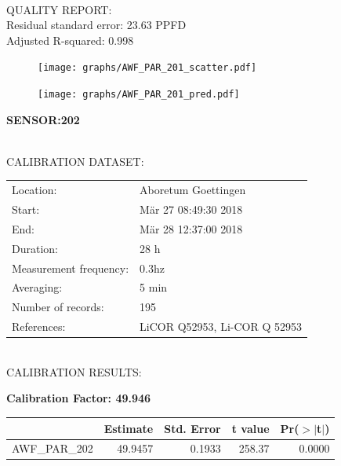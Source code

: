 \documentclass[oneside]{report}
\begin{document}
\hrulefill\\
QUALITY REPORT:\\
Residual standard error: 23.63 PPFD\\
Adjusted R-squared: 0.998



\begin{figure}[H]
  \centering
  \texttt{[image: graphs/AWF\_PAR\_201\_scatter.pdf]}
\end{figure}




\begin{figure}[H]
  \centering
  \texttt{[image: graphs/AWF\_PAR\_201\_pred.pdf]}
\end{figure}

\pagebreak


\begin{center}
\large{\textbf{SENSOR:202}}\\
\end{center}

\hrulefill\\
CALIBRATION DATASET:\\
\begin{table}[h!]
  \centering
  \label{tab:table1}
  \begin{tabular}{ll}
    Location: & Aboretum Goettingen\\ 
    
    
    Start:  & Mär 27 08:49:30 2018 \\
    End:   & Mär 28 12:37:00 2018\\ 
    Duration: & 28 h\\
    Measurement frequency: & 0.3hz\\
    Averaging:  &5 min\\
    Number of records: & 195 \\
    References: & LiCOR Q52953, Li-COR Q 52953 \\
  \end{tabular}
\end{table}

\hrulefill\\
CALIBRATION RESULTS:\\


\begin{center}
\textbf{\large{Calibration Factor: 49.946}}\\
\end{center}
\begin{table}[ht]
\centering
\begin{tabular}{rrrrr}
  \hline
 & Estimate & Std. Error & t value & Pr($>$$|$t$|$) \\ 
  \hline
AWF\_PAR\_202 & 49.9457 & 0.1933 & 258.37 & 0.0000 \\ 
   \hline
\end{tabular}
\end{table}
\end{document}
